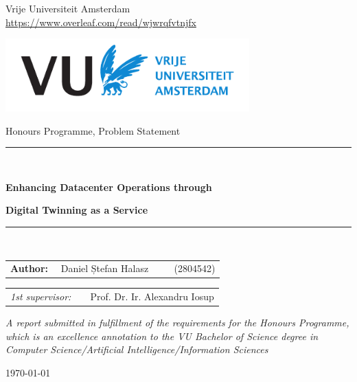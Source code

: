 \thispagestyle{empty}
\begin{center}

Vrije Universiteit Amsterdam
\\
\url{https://www.overleaf.com/read/wjwrqfvtnjfx}
\vspace{1mm}

\includegraphics[height=28mm]{style/vu-griffioen-white.pdf}

\vspace{1.5cm}
{\Large Honours Programme, Problem Statement}
\vspace*{1.5cm}

\rule{.9\linewidth}{.6pt}\\[0.4cm]
{\huge \bfseries Enhancing Datacenter Operations through\par}
{\huge \bfseries Digital Twinning as a Service\par}\vspace{0.4cm}
\rule{.9\linewidth}{.6pt}\\[1.5cm]

\vspace*{2mm}

{\Large
\begin{tabular}{l}
{\bf Author:} ~~Daniel Ștefan Halasz ~~~~ (2804542)
\end{tabular}
}

\vspace*{1.5cm}

\begin{tabular}{ll}
{\it 1st supervisor:}   & ~~Prof. Dr. Ir. Alexandru Iosup \\
\end{tabular}

\vspace*{2cm}

\textit{A report submitted in fulfillment of the requirements for the Honours Programme, \\ which is an excellence annotation to the VU Bachelor of Science degree in\\ Computer Science/Artificial Intelligence/Information Sciences}

\vspace*{1cm}

\today\\[4cm] %

\end{center}
